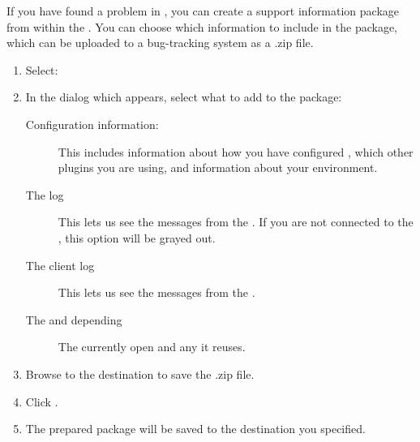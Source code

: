 

If you have found a problem in \app{}, you can create a support information package from  within the \ite{}. You can choose which information to include in the package, which can be uploaded to a bug-tracking system as a .zip file.

\begin{enumerate}
\item Select:\\
\item In the dialog which appears, select what to add to the package: 
\begin{description}
\item [Configuration information:]{This includes information about how you have configured \app{}, which other plugins you are using, and information about your environment. }
\item [The \gdagent{} log]{This lets us see the messages from the \gdagent{}. If you are not connected to the \gdagent{}, this option will be grayed out. }
\item [The client log]{This lets us see the messages from the \ite{}. }
\item [The \gdproject{} and depending \gdprojects{}]{The currently open \gdproject{} and any \gdprojects{} it reuses.}
\end{description}
\item Browse to the destination to save the .zip file.
\item Click . 
\item The prepared package will be saved to the destination you specified.
\end{enumerate}
